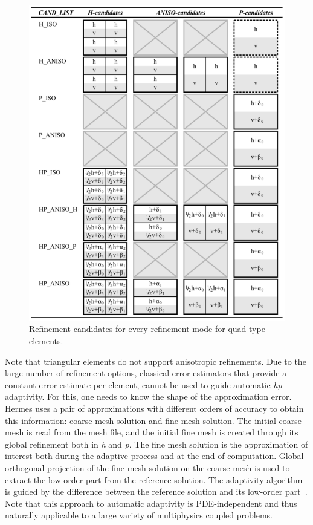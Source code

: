 \begin{figure}[!ht]
  \begin{centering}
  \includegraphics[width=0.8\columnwidth]{cand_list_quads}
  \caption{\label{fig:candlist} Refinement candidates for every
  refinement mode for quad type elements.}
  \end{centering}
\end{figure}
Note that triangular elements do not support anisotropic refinements.
Due to the large number of refinement options, classical error estimators 
that provide a constant error estimate per element, cannot be used to 
guide automatic \emph{hp}-adaptivity. 
For this, one needs to know the shape of the approximation error.
Hermes uses a pair of approximations with different orders of accuracy 
to obtain this information: coarse mesh solution and fine mesh solution. 
The initial coarse mesh is read from the mesh file, and the initial 
fine mesh is created through its global refinement both in \emph{h}
and \emph{p}. The fine mesh solution is the approximation of 
interest both during the adaptive process and at the end of computation. 
Global orthogonal projection of the fine mesh solution on the coarse mesh 
is used to extract the low-order part from the reference solution.
The adaptivity algorithm is guided by the difference between the 
reference solution and its low-order part~\cite{solin2010pde}.
Note that this approach to automatic adaptivity is PDE-independent
and thus naturally applicable to a large variety of multiphysics 
coupled problems.

